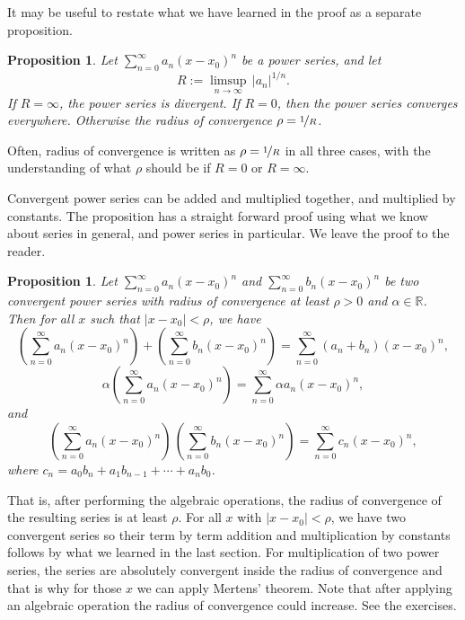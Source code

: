 \documentclass[12pt]{book}
\newcommand{\abs}[1]{\left\lvert {#1} \right\rvert}
\newcommand{\R}{{\mathbb{R}}}
\theoremstyle{plain}
\newtheorem{prop}[thm]{Proposition}
\theoremstyle{remark}
\theoremstyle{definition}
\theoremstyle{exercise}
\theoremstyle{example}
\begin{document}
It may be useful to restate what we have learned in the proof
as a separate proposition.

\begin{prop}
Let $\sum_{n=0}^\infty a_n {(x-x_0)}^n$ be a power series, and let
\begin{equation*}
R := \limsup_{n\to\infty} \, {\abs{a_n}}^{1/n} .
\end{equation*}
If $R = \infty$, the power series is divergent.  If
$R=0$, then the power series converges everywhere.   Otherwise
the radius of convergence $\rho = \nicefrac{1}{R}$.
\end{prop}

Often, radius of convergence is written as $\rho = \nicefrac{1}{R}$ in all
three cases, with
the understanding of what $\rho$ should be if $R = 0$ or $R =
\infty$.

Convergent power series can be added and multiplied together, and multiplied
by constants.
The proposition has a straight forward proof using what we know about series
in general, and power series in particular.  We leave the proof to the reader.

\begin{prop}
Let $\sum_{n=0}^\infty a_n {(x-x_0)}^n$ and
$\sum_{n=0}^\infty b_n {(x-x_0)}^n$ be two convergent power series
with radius of convergence at least $\rho > 0$ and $\alpha \in \R$.  Then
for all $x$ such that $\abs{x-x_0} < \rho$, we have 
\begin{equation*}
\left(\sum_{n=0}^\infty a_n {(x-x_0)}^n\right)
+
\left(\sum_{n=0}^\infty b_n {(x-x_0)}^n\right)
=
\sum_{n=0}^\infty (a_n+b_n) {(x-x_0)}^n ,
\end{equation*}
\begin{equation*}
\alpha
\left(\sum_{n=0}^\infty a_n {(x-x_0)}^n\right)
=
\sum_{n=0}^\infty \alpha a_n {(x-x_0)}^n ,
\end{equation*}
and
\begin{equation*}
\left(\sum_{n=0}^\infty a_n {(x-x_0)}^n\right)
\,
\left(\sum_{n=0}^\infty b_n {(x-x_0)}^n\right)
=
\sum_{n=0}^\infty c_n {(x-x_0)}^n ,
\end{equation*}
where
$c_n = a_0b_n + a_1 b_{n-1} + \cdots + a_n b_0$.
\end{prop}

That is, after performing the algebraic operations, the
radius of convergence of the resulting series is at least $\rho$.
For all $x$ with $\abs{x-x_0} < \rho$, we have two convergent series so
their term by term addition and multiplication by constants
follows by what we learned in the last section.
For multiplication of two power series,
the series are absolutely convergent inside
the radius of convergence and that is why for those $x$
we can apply Mertens' theorem.
Note that after applying an algebraic operation the radius of convergence
could increase.  See the exercises.
\end{document}
